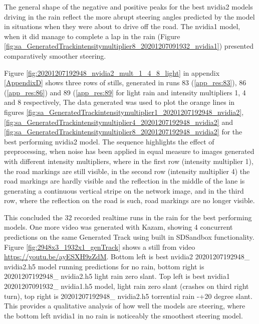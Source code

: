 The general shape of the negative and positive peaks for the best nvidia2 models driving in the rain reflect the more abrupt steering angles predicted by the model in situations when they were about to drive off the road. The nvidia1 model, when it did manage to complete a lap in the rain (Figure \ref{fig:sa_GeneratedTrackintensitymultiplier8_20201207091932_nvidia1}) presented comparatively smoother steering.



Figure \ref{fig:20201207192948_nvidia2_mult_1_4_8_light} in appendix \ref{AppendixD} shows three rows of stills, generated in runs 83 (\ref{app_res:83}), 86 (\ref{app_res:86}) and 89 (\ref{app_res:89}  for light rain and intensity multipliers 1, 4 and 8 respectively, The data generated was used to plot the orange lines in figures  \ref{fig:sa_GeneratedTrackintensitymultiplier1_20201207192948_nvidia2}, 
\ref{fig:sa_GeneratedTrackintensitymultiplier4_20201207192948_nvidia2} and 
\ref{fig:sa_GeneratedTrackintensitymultiplier8_20201207192948_nvidia2} for the best performing nvidia2 model. The sequence highlights the effect of preprocessing, when noise has been applied in equal measure to images generated with different intensity multipliers, where in the first row (intensity multiplier 1), the road markings are still visible, in the second row (intensity multiplier 4) the road markings are hardly visible and the reflection in the middle of the lane is generating a continuous vertical stripe on the network image, and in the third row, where the reflection on the road is such, road markings are no longer visible.

This concluded the 32 recorded realtime runs in the rain for the best performing models. One more video was generated with Kazam, showing 4 concurrent predictions on the same Generated Track using built in SDSandbox functionality. Figure  \ref{fig:2948x3_1932x1_genTrack}  shows a still from video \url{https://youtu.be/ayESXH9zZdM}.
Bottom left is best nvidia2 20201207192948\_ nvidia2.h5 model running predictions for no rain, bottom right is 20201207192948\_ nvidia2.h5 light rain zero slant. Top left is best nvidia1   
20201207091932\_ nvidia1.h5 model, light rain zero slant (crashes on third right turn), top right is 20201207192948\_ nvidia2.h5 torrential rain -+20 degree slant. This provides a qualitative analysis of how well the models are steering, where the bottom left nvidia1 in no rain is noticeably the smoothest steering model.

